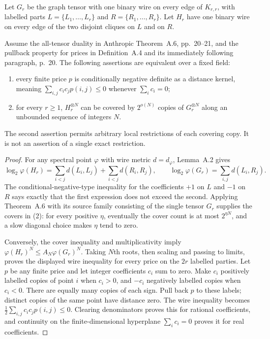 Let $G_r$ be the graph tensor with one binary wire on every edge of
$K_{r,r}$, with labelled parts $L=\{L_1,\ldots,L_r\}$ and
$R=\{R_1,\ldots,R_r\}$.  Let $H_r$ have one binary wire on every
edge of the two disjoint cliques on $L$ and on $R$.

\begin{proposition}
\label{prop:cnd-graph-gate}
Assume the all-tensor duality in Anthropic Theorem~A.6, pp.~20--21,
and the pullback property for prices in Definition~A.4 and its
immediately following paragraph, p.~20.
The following assertions are equivalent over a fixed field:
\begin{enumerate}
\item every finite price $p$ is conditionally negative definite as a
distance kernel, meaning
$\sum_{i,j}c_ic_jp(i,j)\le0$ whenever $\sum_i c_i=0$;
\item for every $r\ge1$, $H_r^{\otimes N}$ can be covered by
$2^{o(N)}$ copies of $G_r^{\otimes N}$ along an unbounded sequence
of integers $N$.
\end{enumerate}
The second assertion permits arbitrary local restrictions of each
covering copy.  It is not an assertion of a single exact restriction.
\end{proposition}
\begin{proof}
For any spectral point $\varphi$ with wire metric $d=d_\varphi$,
Lemma~A.2 gives
\[
 \log_2\varphi(H_r)=
 \sum_{i<j}d(L_i,L_j)+\sum_{i<j}d(R_i,R_j),\qquad
 \log_2\varphi(G_r)=\sum_{i,j}d(L_i,R_j).
\]
The conditional-negative-type inequality for the coefficients
$+1$ on $L$ and $-1$ on $R$ says exactly that the first expression
does not exceed the second.  Applying Theorem~A.6 with its source
family consisting of the single tensor $G_r$ supplies the covers in
(2): for every positive $\eta$, eventually the cover count is at most
$2^{\eta N}$, and a slow diagonal choice makes $\eta$ tend to zero.

Conversely, the cover inequality and multiplicativity imply
$\varphi(H_r)^N\le A_N\varphi(G_r)^N$.  Taking $N$th roots,
then scaling and passing to limits, proves the displayed wire
inequality for every price on the $2r$ labelled parties.
Let $p$ be any finite price and let integer coefficients $c_i$ sum
to zero.  Make $c_i$ positively labelled copies of point $i$ when
$c_i>0$, and $-c_i$ negatively labelled copies when $c_i<0$.
There are equally many copies of each sign.  Pull back $p$ to
these labels; distinct copies of the same point have distance zero.
The wire inequality becomes
$\frac12\sum_{i,j}c_ic_jp(i,j)\le0$.
Clearing denominators proves this for rational coefficients, and
continuity on the finite-dimensional hyperplane $\sum_i c_i=0$
proves it for real coefficients.
\end{proof}


